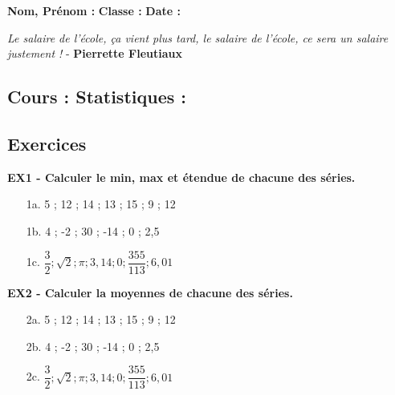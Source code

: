 



\textbf{Nom, Prénom :} \hspace{8cm} \textbf{Classe :} \hspace{3cm} \textbf{Date :}\\

\begin{center}
  \textit{Le salaire de l’école, ça vient plus tard, le salaire de l’école, ce sera un salaire justement !}  - \textbf{Pierrette Fleutiaux}
\end{center}

\subsection*{Cours : Statistiques :}

\Pointilles[5]

\subsection*{Exercices}

\textbf{EX1 - Calculer le min, max et étendue de chacune des séries.}

\begin{multicols}{3}

\begin{enumerate}
  \item[1a.] 5 ; 12 ; 14 ; 13 ; 15 ; 9 ; 12  \\ \Pointilles[5]
  \item[1b.] 4 ; -2  ; 30 ; -14 ; 0 ; 2,5 \\ \Pointilles[5]
  \item[1c.] $\dfrac{3}{2} ; \sqrt{2} ; \pi ; 3,14 ; 0 ; \dfrac{355}{113}; 6,01$ \\ \Pointilles[5]
\end{enumerate}

\end{multicols}

\textbf{EX2 - Calculer la moyennes de chacune des séries.}

\begin{multicols}{3}

  \begin{enumerate}
  \item[2a.] 5 ; 12 ; 14 ; 13 ; 15 ; 9 ; 12  \\ \Pointilles[3]
  \item[2b.] 4 ; -2  ; 30 ; -14 ; 0 ; 2,5 \\ \Pointilles[3]
  \item[2c.] $\dfrac{3}{2} ; \sqrt{2} ; \pi ; 3,14 ; 0 ; \dfrac{355}{113}; 6,01$  \\ \Pointilles[3]
\end{enumerate}

\end{multicols}


